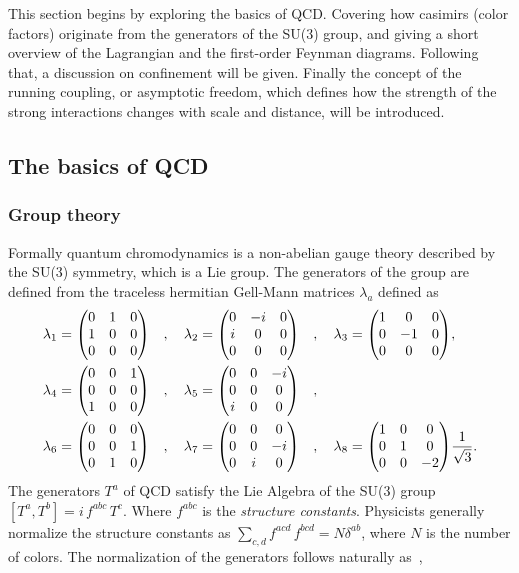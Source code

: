 \documentclass[main.tex]{subfiles}
\begin{document}
This section begins by exploring the basics of QCD. Covering how casimirs (color factors) originate from the generators of the SU(3) group, and giving a short overview of the Lagrangian and the first-order Feynman diagrams. Following that, a discussion on confinement will be given. Finally the concept of the running coupling, or asymptotic freedom, which defines how the strength of the strong interactions changes with scale and distance, will be introduced.

\subsection{The basics of QCD}
\subsubsection*{Group theory}
Formally quantum chromodynamics is a non-abelian gauge theory described by the SU(3) symmetry, which is a Lie group. The generators of the group are defined from the traceless hermitian Gell-Mann matrices \(\lambda_a\) defined as
\begin{align}\label{eqn: gell_mann_matrices}
    \begin{split}
    \lambda_1 = \mqty(0&1&0\\1&0&0\\0&0&0) \quad, \quad \lambda_2 &= \mqty(0&-i&0\\i&0&0\\0&0&0) \quad, \quad \lambda_3 = \mqty(1&0&0\\0&-1&0\\0&0&0), \\
    \lambda_4 = \mqty(0&0&1\\0&0&0\\1&0&0) \quad, \quad \lambda_5 &= \mqty(0&0&-i\\0&0&0\\i&0&0) \quad ,\\
    \lambda_6 = \mqty(0&0&0\\0&0&1\\0&1&0) \quad ,\quad \lambda_7 &= \mqty(0&0&0\\0&0&-i\\0&i&0) \quad, \quad \lambda_8 = \mqty(1&0&0\\0&1&0\\0&0&-2)\frac{1}{\sqrt{3}}.
    \end{split}
\end{align}
The generators \(T^a\) of QCD satisfy the Lie Algebra of the SU(3) group \(\left[T^a, T^b\right] = i \, f^{abc}\, T^c\). Where \(f^{abc}\) is the \emph{structure constants}. Physicists generally normalize the structure constants as \(\sum_{c,d}f^{acd}\, f^{bcd} = N \delta^{ab}\), where \(N\) is the number of colors. The normalization of the generators follows naturally as~\cite[p.485]{schwartz2014quantum},
\end{document}
